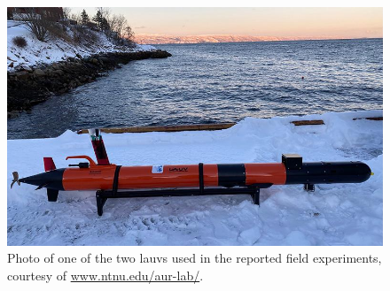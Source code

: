 \begin{figure}[p]
    \centering
    \includegraphics[width = 0.5\columnwidth]{figures/distr_NSB/LAUV-Roald}
    \vspace*{-1mm}
    \caption{Photo of one of the two \glspl{lauv} used in the reported field experiments, courtesy of \url{www.ntnu.edu/aur-lab/}.}
    \label{fig:distr_NSB_LAUV}
    \vspace*{-10mm}
\end{figure}

